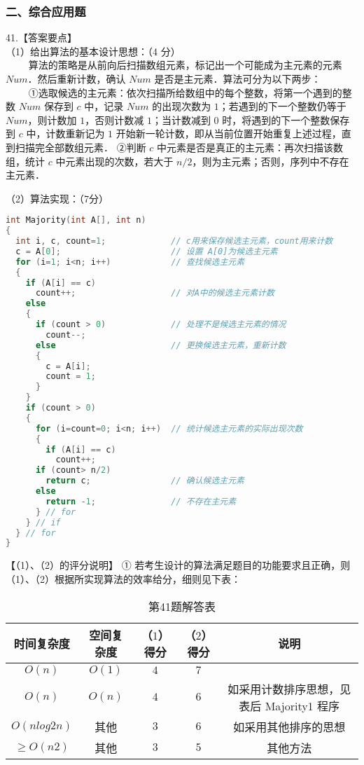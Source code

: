 \subsubsection{二、综合应用题}

41.【答案要点】 \\
（1）给出算法的基本设计思想：（4 分） \\
$\qquad$ 算法的策略是从前向后扫描数组元素，标记出一个可能成为主元素的元素 $Num$．然后重新计数，确认 $Num$ 是否是主元素．算法可分为以下两步： \\
$\qquad$ ①选取候选的主元素：依次扫描所给数组中的每个整数，将第一个遇到的整数 $Num$ 保存到 $c$ 中，记录 $Num$ 的出现次数为 $1$；若遇到的下一个整数仍等于 $Num$，则计数加 $1$，否则计数减 $1$；当计数减到 $0$ 时，将遇到的下一个整数保存到 $c$ 中，计数重新记为 $1$ 开始新一轮计数，即从当前位置开始重复上述过程，直到扫描完全部数组元素． 
②判断 $c$ 中元素是否是真正的主元素：再次扫描该数组，统计 $c$ 中元素出现的次数，若大于 $n/2$，则为主元素；否则，序列中不存在主元素．

（2）算法实现：（7分）
\begin{lstlisting}[language=cpp]
int Majority(int A[], int n)
{ 
  int i, c, count=1;             // c用来保存候选主元素，count用来计数
  c = A[0];                      // 设置 A[0]为候选主元素
  for (i=1; i<n; i++)            // 查找候选主元素
  {
    if (A[i] == c)
      count++;                   // 对A中的候选主元素计数
    else
    {
      if (count > 0)             // 处理不是候选主元素的情况
        count--;
      else                       // 更换候选主元素，重新计数
      {
        c = A[i]; 
        count = 1; 
      }
    }
    if (count > 0)
    {
      for (i=count=0; i<n; i++)  // 统计候选主元素的实际出现次数
      {
        if (A[i] == c)
          count++; 
      if (count> n/2)
        return c;                // 确认候选主元素
      else
        return -1;               // 不存在主元素 
      } // for
    } // if
  } // for
}
\end{lstlisting}

【（1）、（2）的评分说明】
① 若考生设计的算法满足题目的功能要求且正确，则（1）、（2）根据所实现算法的效率给分，细则见下表： 
\begin{table}[ht]
\centering
\caption{第41题解答表}\label{CSN13_tab8}
\begin{tabular}{|c|c|c|c|c|}
\hline
时间复杂度 & 空间复杂度 & （$1$）得分 & （$2$）得分 & 说明  \\
\hline
$O(n)$ & $O(1)$ & $4$ & $7$ &  \\
\hline
$O(n)$ & $O(n)$ & $4$ & $6$ & 如采用计数排序思想，见表后 Majority1 程序  \\
\hline
$O(nlog2n)$ & 其他 & $3$ & $6$ & 如采用其他排序的思想  \\
\hline
$\geqslant O(n2)$ & 其他 & $3$ & $5$ & 其他方法  \\
\hline
\end{tabular}
\end{table}

